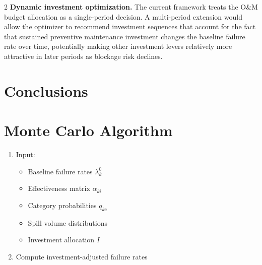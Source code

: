\documentclass[10pt]{article}
\begin{document}
\begin{multicols}{2}
\textbf{Dynamic investment optimization.} The current framework
treats the O\&M budget allocation as a single-period decision.
A multi-period extension would allow the optimizer to recommend
investment sequences that account for the fact that sustained
preventive maintenance investment changes the baseline failure
rate over time, potentially making other investment levers
relatively more attractive in later periods as blockage risk
declines.

\section{Conclusions}


\appendix




\section{Monte Carlo Algorithm}

\begin{enumerate}[leftmargin=*]

\item Input:
\begin{itemize}
    \item Baseline failure rates $\lambda_k^0$
    \item Effectiveness matrix $\alpha_{ki}$
    \item Category probabilities $q_{kc}$
    \item Spill volume distributions
    \item Investment allocation $I$
\end{itemize}

\item Compute investment-adjusted failure rates


\end{enumerate}
\end{multicols}
\end{document}
